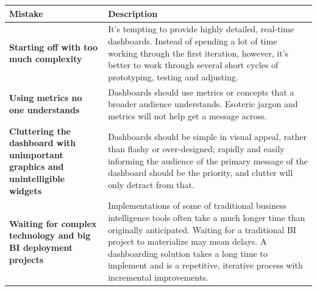 \documentclass[]{book}
\begin{document}
\begin{longtable}[]{@{}ll@{}}
\toprule
\begin{minipage}[b]{0.28\columnwidth}\raggedright
\textbf{Mistake}\strut
\end{minipage} & \begin{minipage}[b]{0.66\columnwidth}\raggedright
\textbf{Description}\strut
\end{minipage}\tabularnewline
\midrule
\endhead
\begin{minipage}[t]{0.28\columnwidth}\raggedright
\textbf{Starting off with too much complexity}\strut
\end{minipage} & \begin{minipage}[t]{0.66\columnwidth}\raggedright
It's tempting to provide highly detailed, real-time dashboards. Instead of spending a lot of time working through the first iteration, however, it's better to work through several short cycles of prototyping, testing and adjusting.\strut
\end{minipage}\tabularnewline
\begin{minipage}[t]{0.28\columnwidth}\raggedright
\textbf{Using metrics no one understands}\strut
\end{minipage} & \begin{minipage}[t]{0.66\columnwidth}\raggedright
Dashboards should use metrics or concepts that a broader audience understands. Esoteric jargon and metrics will not help get a message across.\strut
\end{minipage}\tabularnewline
\begin{minipage}[t]{0.28\columnwidth}\raggedright
\textbf{Cluttering the dashboard with unimportant graphics and unintelligible widgets}\strut
\end{minipage} & \begin{minipage}[t]{0.66\columnwidth}\raggedright
Dashboards should be simple in visual appeal, rather than flashy or over-designed; rapidly and easily informing the audience of the primary message of the dashboard should be the priority, and clutter will only detract from that.\strut
\end{minipage}\tabularnewline
\begin{minipage}[t]{0.28\columnwidth}\raggedright
\textbf{Waiting for complex technology and big BI deployment projects}\strut
\end{minipage} & \begin{minipage}[t]{0.66\columnwidth}\raggedright
Implementations of some of traditional business intelligence tools often take a much longer time than originally anticipated. Waiting for a traditional BI project to materialize may mean delays. A dashboarding solution takes a long time to implement and is a repetitive, iterative process with incremental improvements.\strut

\end{minipage}
\end{longtable}
\end{document}
